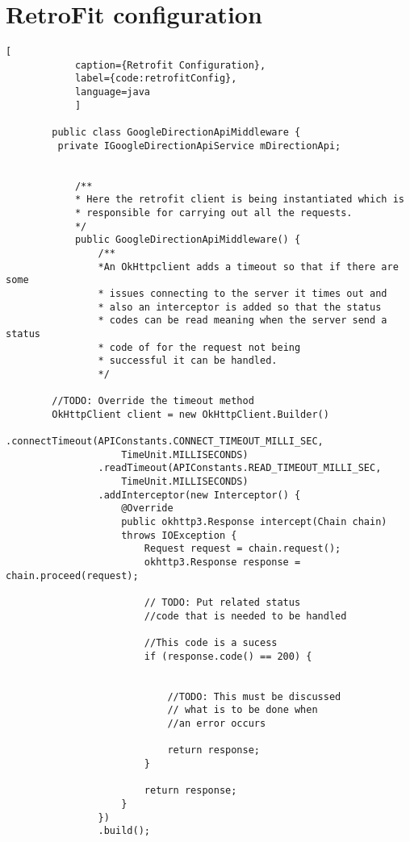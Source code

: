 \newpage
        \section{RetroFit configuration}
        \begin{lstlisting}[
            caption={Retrofit Configuration},
            label={code:retrofitConfig},
            language=java
            ]

        public class GoogleDirectionApiMiddleware {
         private IGoogleDirectionApiService mDirectionApi;


            /**
            * Here the retrofit client is being instantiated which is
            * responsible for carrying out all the requests.
            */
            public GoogleDirectionApiMiddleware() {
                /**
                *An OkHttpclient adds a timeout so that if there are some 
                * issues connecting to the server it times out and
                * also an interceptor is added so that the status 
                * codes can be read meaning when the server send a status 
                * code of for the request not being
                * successful it can be handled.
                */

        //TODO: Override the timeout method
        OkHttpClient client = new OkHttpClient.Builder()
                .connectTimeout(APIConstants.CONNECT_TIMEOUT_MILLI_SEC, 
                    TimeUnit.MILLISECONDS)
                .readTimeout(APIConstants.READ_TIMEOUT_MILLI_SEC, 
                    TimeUnit.MILLISECONDS)
                .addInterceptor(new Interceptor() {
                    @Override
                    public okhttp3.Response intercept(Chain chain) 
                    throws IOException {
                        Request request = chain.request();
                        okhttp3.Response response = chain.proceed(request);

                        // TODO: Put related status 
                        //code that is needed to be handled

                        //This code is a sucess
                        if (response.code() == 200) {


                            //TODO: This must be discussed
                            // what is to be done when 
                            //an error occurs

                            return response;
                        }

                        return response;
                    }
                })
                .build();


\end{lstlisting}
